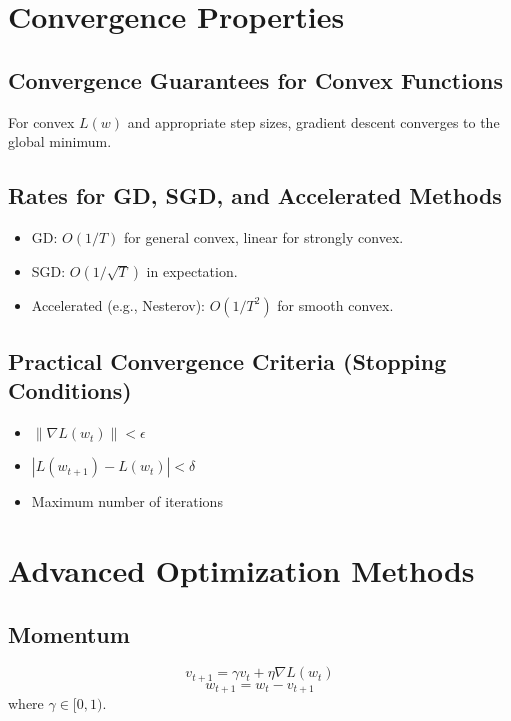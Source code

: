 \documentclass{article}
\begin{document}
\section{Convergence Properties}

\subsection{Convergence Guarantees for Convex Functions}
For convex $L(w)$ and appropriate step sizes, gradient descent converges to the global minimum.

\subsection{Rates for GD, SGD, and Accelerated Methods}
\begin{itemize}
    \item GD: $O(1/T)$ for general convex, linear for strongly convex.
    \item SGD: $O(1/\sqrt{T})$ in expectation.
    \item Accelerated (e.g., Nesterov): $O(1/T^2)$ for smooth convex.
\end{itemize}

\subsection{Practical Convergence Criteria (Stopping Conditions)}
\begin{itemize}
    \item $\|\nabla L(w_t)\| < \epsilon$
    \item $|L(w_{t+1}) - L(w_t)| < \delta$
    \item Maximum number of iterations
\end{itemize}
\section{Advanced Optimization Methods}

\subsection{Momentum}
\[
v_{t+1} = \gamma v_t + \eta \nabla L(w_t)
\]
\[
w_{t+1} = w_t - v_{t+1}
\]
where $\gamma \in [0, 1)$.
\end{document}
